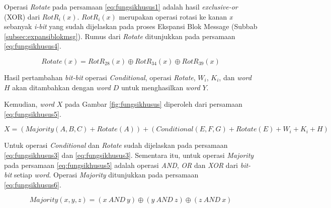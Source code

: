 Operasi \textit{Rotate} pada persamaan \ref{eq:fungsikhusus1} adalah hasil \textit{exclusive-or} (XOR) dari \begin{math}RotR_i(x)\end{math}. \begin{math}RotR_i(x)\end{math} merupakan operasi rotasi ke kanan \textit{x} sebanyak \textit{i-bit} yang sudah dijelaskan pada proses Ekspansi Blok Message (Subbab \ref{subsec:expansiblokmsg}). Rumus dari \textit{Rotate} ditunjukkan pada persamaan \ref{eq:fungsikhusus4}.

\begin{equation}
	Rotate(x) = RotR_{28}(x) \oplus RotR_{34}(x) \oplus RotR_{39}(x) \label{eq:fungsikhusus4}
\end{equation}

Hasil pertambahan \textit{bit-bit} operasi \textit{Conditional}, operasi \textit{Rotate}, \begin{math}W_i\end{math}, \begin{math}K_i\end{math}, dan \textit{word} \begin{math}H\end{math} akan ditambahkan dengan \textit{word} \begin{math}D\end{math} untuk menghasilkan \textit{word} \begin{math}Y\end{math}.

Kemudian, \textit{word} \begin{math}X\end{math} pada Gambar \ref{fig:fungsikhusus} diperoleh dari persamaan \ref{eq:fungsikhusus5}.

\begin{equation}
	X = (Majority(A,B,C) + Rotate(A)) + (Conditional(E,F,G) + Rotate(E) + W_i + K_i + H) \label{eq:fungsikhusus5}
\end{equation}

Untuk operasi \textit{Conditional} dan \textit{Rotate} sudah dijelaskan pada persamaan \ref{eq:fungsikhusus3} dan \ref{eq:fungsikhusus3}. Sementara itu, untuk operasi \textit{Majority} pada persamaan \ref{eq:fungsikhusus5} adalah operasi \textit{AND}, \textit{OR} dan \textit{XOR} dari \textit{bit-bit} setiap \textit{word}. Operasi \textit{Majority} ditunjukkan pada persamaan \ref{eq:fungsikhusus6}.

\begin{equation}
	Majority(x,y,z) = (x\: AND\: y) \oplus (y\: AND\: z) \oplus (z\: AND\: x) \label{eq:fungsikhusus6}
\end{equation}

